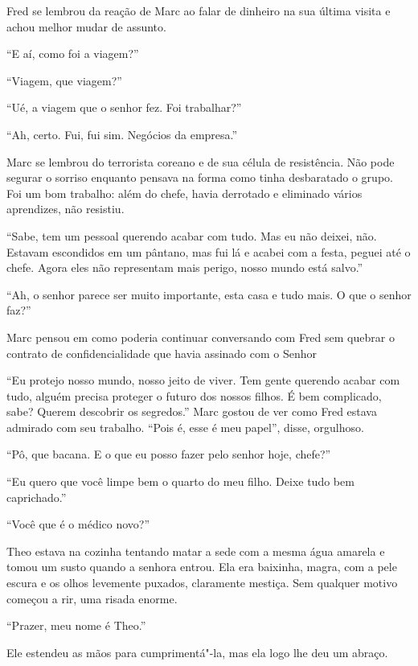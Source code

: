 Fred se lembrou da reação de Marc ao falar de dinheiro na sua última
visita e achou melhor mudar de assunto.

``E aí, como foi a viagem?''

``Viagem, que viagem?''

``Ué, a viagem que o senhor fez. Foi trabalhar?''

``Ah, certo. Fui, fui sim. Negócios da empresa.''

Marc se lembrou do terrorista coreano e de sua célula de resistência.
Não pode segurar o sorriso enquanto pensava na forma como tinha
desbaratado o grupo. Foi um bom trabalho: além do chefe, havia derrotado
e eliminado vários aprendizes, não resistiu.

``Sabe, tem um pessoal querendo acabar com tudo. Mas eu não deixei, não.
Estavam escondidos em um pântano, mas fui lá e acabei com a festa,
peguei até o chefe. Agora eles não representam mais perigo, nosso mundo
está salvo.''

``Ah, o senhor parece ser muito importante, esta casa e tudo mais. O que
o senhor faz?''

Marc pensou em como poderia continuar conversando com Fred sem quebrar o
contrato de confidencialidade que havia assinado com o Senhor 

``Eu protejo nosso mundo, nosso jeito de viver. Tem gente querendo
acabar com tudo, alguém precisa proteger o futuro dos nossos filhos. É
bem complicado, sabe? Querem descobrir os segredos.'' Marc gostou de ver
como Fred estava admirado com seu trabalho. ``Pois é, esse é meu
papel'', disse, orgulhoso.

``Pô, que bacana. E o que eu posso fazer pelo senhor hoje, chefe?''

``Eu quero que você limpe bem o quarto do meu filho. Deixe tudo bem
caprichado.''

\asterisc


``Você que é o médico novo?''

Theo estava na cozinha tentando matar a sede com a mesma água amarela e
tomou um susto quando a senhora entrou. Ela era baixinha, magra, com a
pele escura e os olhos levemente puxados, claramente mestiça. Sem
qualquer motivo começou a rir, uma risada enorme.

``Prazer, meu nome é Theo.''

Ele estendeu as mãos para cumprimentá"-la, mas ela logo lhe deu um
abraço.

